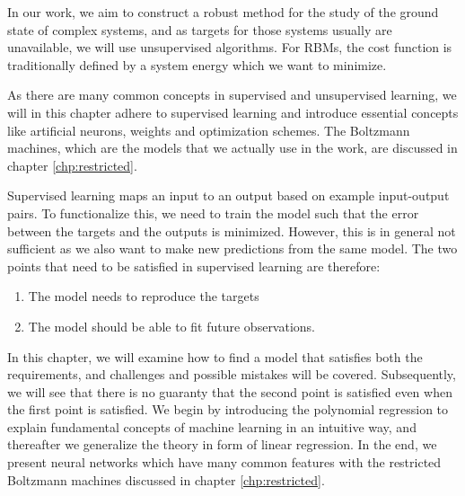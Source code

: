 In our work, we aim to construct a robust method for the study of the ground state of complex systems, and as targets for those systems usually are unavailable, we will use unsupervised algorithms. For RBMs, the cost function is traditionally defined by a system energy which we want to minimize. 

As there are many common concepts in supervised and unsupervised learning, we will in this chapter adhere to supervised learning and introduce essential concepts like artificial neurons, weights and optimization schemes. The Boltzmann machines, which are the models that we actually use in the work, are discussed in chapter \ref{chp:restricted}.

Supervised learning maps an input to an output based on example input-output pairs. To functionalize this, we need to train the model such that the error between the targets and the outputs is minimized. However, this is in general not sufficient as we also want to make new predictions from the same model. The two points that need to be satisfied in supervised learning are therefore:
\begin{enumerate}
	\item The model needs to reproduce the targets
	\item The model should be able to fit future observations.
\end{enumerate}
In this chapter, we will examine how to find a model that satisfies both the requirements, and challenges and possible mistakes will be covered. Subsequently, we will see that there is no guaranty that the second point is satisfied even when the first point is satisfied. We begin by introducing the polynomial regression to explain fundamental concepts of machine learning in an intuitive way, and thereafter we generalize the theory in form of linear regression. In the end, we present neural networks which have many common features with the restricted Boltzmann machines discussed in chapter \ref{chp:restricted}. 

